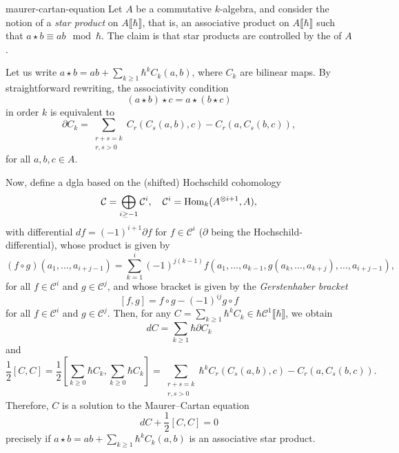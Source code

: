 \begin{example}{maurer-cartan-equation}
    Let $A$ be a commutative $k$-algebra, and consider the notion of a \textit{star product} on $A \llbracket \hbar \rrbracket$, that is, an associative product on $A \llbracket \hbar \rrbracket$ such that $a \star b \equiv ab \mod \hbar$. The claim is that star products are controlled by the  of $A$.
    
    Let us write $a \star b = ab + \sum_{k \ge 1} \hbar^k C_k(a, b)$, where $C_k$ are bilinear maps. By straightforward rewriting, the associativity condition
    \[ (a \star b) \star c = a \star (b \star c) \]
    in order $k$ is equivalent to
    \[ \partial C_k = \sum_{\substack{r + s = k \\ r, s > 0}} C_r(C_s(a, b), c) - C_r(a, C_s(b, c)) , \]
    for all $a, b, c \in A$.
    
    Now, define a dgla based on the (shifted) Hochschild cohomology
    \[ \mathcal{C} = \bigoplus_{i \ge -1} \mathcal{C}^i, \quad \mathcal{C}^i = \operatorname{Hom}_k(A^{\otimes i + 1}, A) , \]
    with differential $df = (-1)^{i + 1} \partial f$ for $f \in \mathcal{C}^i$ ($\partial$ being the Hochschild-differential), whose product is given by
    \[ (f \circ g)(a_1, \ldots, a_{i + j - 1}) = \sum_{k = 1}^{i} (-1)^{j(k - 1)} f(a_1, \ldots, a_{k - 1}, g(a_k, \ldots, a_{k + j}), \ldots, a_{i + j - 1}) , \] for all $f \in \mathcal{C}^i$ and $g \in \mathcal{C}^j$, and whose bracket is given by the \textit{Gerstenhaber bracket}
    \[ [f, g] = f \circ g - (-1)^{ij} g \circ f \]
    for all $f \in \mathcal{C}^i$ and $g \in \mathcal{C}^j$.
    Then, for any $C = \sum_{k \ge 1} \hbar^k C_k \in \hbar \mathcal{C}^1 \llbracket \hbar \rrbracket$, we obtain
    \[ dC = \sum_{k \ge 1} \hbar \partial C_k \]
    and
    \[ \frac{1}{2} [C, C] = \frac{1}{2} \left[ \sum_{k \ge 0} \hbar C_k, \sum_{k \ge 0} \hbar C_k \right] = \sum_{\substack{r + s = k \\ r, s > 0}} \hbar^k C_r(C_s(a, b), c) - C_r(a, C_s(b, c)) . \]
    Therefore, $C$ is a solution to the Maurer--Cartan equation
    \[ dC + \frac{1}{2}[C, C] = 0 \]
    precisely if $a \star b = ab + \sum_{k \ge 1} \hbar^k C_k(a, b)$ is an associative star product.
\end{example}

